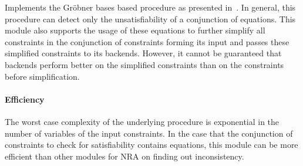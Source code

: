Implements the Gr\"obner bases based procedure as presented in~\cite{JLCA_CAI13}. In general, this procedure can detect only the unsatisfiability of a conjunction of equations. This module also supports the usage of these equations to further simplify all constraints in the conjunction of constraints forming its input and passes these simplified constraints to its backends. However, it cannot be guaranteed that backends perform better on the simplified constraints than on the constraints before simplification.

\paragraph{Efficiency} The worst case complexity of the underlying procedure is exponential in the number of variables of the input constraints. In the case that the conjunction of constraints to check for satisfiability contains equations, this module can be more efficient than other modules for NRA on finding out inconsistency.